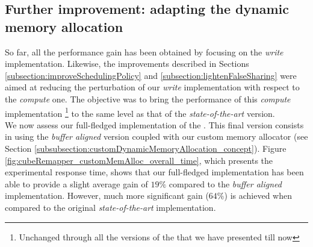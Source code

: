 	\subsection{Further improvement: adapting the dynamic memory allocation}\label{subsection:customDynamicMemAlloc}
		So far, all the performance gain has been obtained by focusing on the \emph{write} implementation.   Likewise, the improvements described in Sections \ref{subsection:improveSchedulingPolicy} and \ref{subsection:lightenFalseSharing} were aimed at reducing the perturbation of our \emph{write} implementation with respect to the \emph{compute} one.   The objective was to bring the performance of this \emph{compute} implementation \footnote{Unchanged through all the versions of the \toolTargetSoftware that we have presented till now} to the same level as that of the \emph{state-of-the-art} version.\\

		We now assess our full-fledged \notationaio\space implementation of the \toolTargetSoftware.   This final version consists in using the \emph{buffer aligned} version coupled with our custom memory allocator (see Section \ref{subsubsection:customDynamicMemoryAllocation_concept}).   Figure \ref{fig:cubeRemapper_customMemAlloc_overall_time}, which presents the experimental response time, shows that our full-fledged implementation has been able to provide a slight average gain of $19\%$ compared to the \emph{buffer aligned} implementation.   However, much more significant gain ($64\%$) is achieved when compared to the original \emph{state-of-the-art} implementation.

